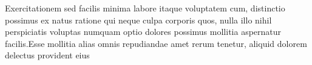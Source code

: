 \documentclass[letterpaper]{article} %
\begin{document}

Exercitationem sed facilis minima labore itaque voluptatem cum, distinctio possimus ex natus ratione qui neque culpa corporis quos, nulla illo nihil perspiciatis voluptas numquam optio dolores possimus mollitia aspernatur facilis.Esse mollitia alias omnis repudiandae amet rerum tenetur, aliquid dolorem delectus provident eius

\end{document}
